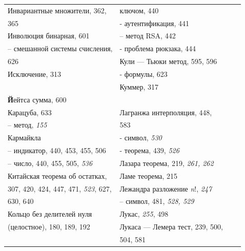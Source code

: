 \documentclass{mai_book}
\begin{document}
{\begin{tabular}{llcc}
		Инвариантные множители, 362, & ключом, 440 \\
		365 & - аутентификация, 441 \\
		Инволюция бинарная, 601 & -- метод RSA, 442 \\
		-- смешанной системы счисления, & - проблема рюкзака, 444 \\
		626 & Кули — Тьюки метод, 595, 596 \\
		Исключение, 313 & - формулы, 623 \\
		& Куммер, 317 \\
		\textbf{Й}ейтса сумма, 600 & \\
		Карацуба, 633 & Лагранжа интерполяция, 448, \\
		-- метод, \emph{155} & 583 \\
		Кармайкла & - символ, \emph{530} \\
		-- индикатор, 440, 453, 455, 506 & - теорема, 439, \emph{526} \\
		-- число, 440, 455, 505, \emph{536} & Лазара теорема, 219, {\itshape 261, 262} \\
		Китайская теорема об остатках, & Ламе теорема, 215 \\
		307, 420, 424, 447, 471, \emph{523}, 627, & Лежандра разложение \emph{n}!, \emph{247} \\
		630, 640 & -- символ, 481, {\itshape 528, 529} \\
		Кольцо без делителей нуля & Лукас, \emph{255}, 498 \\
		(целостное), 180, 189, 192 & Лукаса — Лемера тест, 239, 500, \\	
		& 504, 581 \\
	\end{tabular}

}
\end{document}
